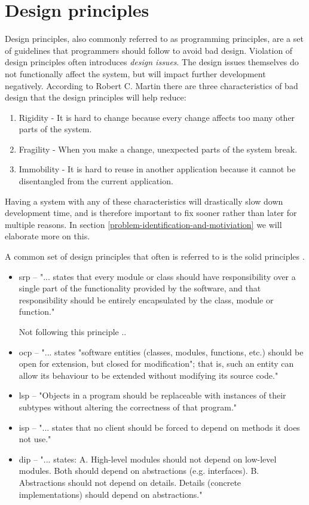 \documentclass{report}
\begin{document}
\section{Design principles}
\label{design-principles}
Design principles, also commonly referred to as programming principles, are a set of guidelines that programmers should follow to avoid bad design. Violation of design principles often introduces \textit{design issues}. The design issues themselves do not functionally affect the system, but will impact further development negatively. According to Robert C. Martin \cite{robertcmartinprinciples} there are three characteristics of bad design that the design principles will help reduce:

\begin{enumerate}
	\item Rigidity - It is hard to change because every change affects too many other parts of the system.
	\item Fragility - When you make a change, unexpected parts of the system break.
	\item Immobility - It is hard to reuse in another application because it cannot be disentangled from the current application.
\end{enumerate}

Having a system with any of these characteristics will drastically slow down development time, and is therefore important to fix sooner rather than later for multiple reasons. In section \ref{problem-identification-and-motiviation} we will elaborate more on this.

A common set of design principles that often is referred to is the \gls{solid} principles \cite{solid}.

\begin{itemize}
    \item \gls{srp} -- "... states that every module or class should have responsibility over a single part of the functionality provided by the software, and that responsibility should be entirely encapsulated by the class, module or function." \cite{srp}
    
    Not following this principle .. 
    \item \gls{ocp} -- "... states "software entities (classes, modules, functions, etc.) should be open for extension, but closed for modification"; that is, such an entity can allow its behaviour to be extended without modifying its source code." \cite{ocp}
    \item \gls{lsp} -- "Objects in a program should be replaceable with instances of their subtypes without altering the correctness of that program." \cite{lsp}
    \item \gls{isp} -- "... states that no client should be forced to depend on methods it does not use." \cite{isp}
    \item \gls{dip} --  "... states: \newline A. High-level modules should not depend on low-level modules. Both should depend on abstractions (e.g. interfaces). \newline
B. Abstractions should not depend on details. Details (concrete implementations) should depend on abstractions." \cite{dip}
\end{itemize}
    
\end{document}
